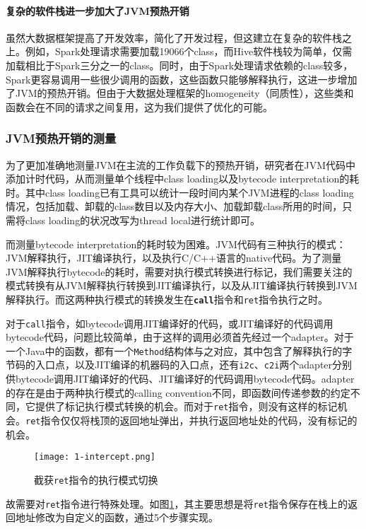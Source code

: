 \documentclass[lang=cn,12pt,a4paper,cite=authoryear]{elegantpaper}
\begin{document}
\begin{figure*}[!htp]
\paragraph{复杂的软件栈进一步加大了JVM预热开销} 虽然大数据框架提高了开发效率，简化了开发过程，但这建立在复杂的软件栈之上。例如，Spark处理请求需要加载19066个class，而Hive软件栈较为简单，仅需加载相比于Spark三分之一的class。同时，由于Spark处理请求依赖的class较多，Spark更容易调用一些很少调用的函数，这些函数只能够解释执行，这进一步增加了JVM的预热开销。但由于大数据处理框架的homogeneity（同质性），这些类和函数会在不同的请求之间复用，这为我们提供了优化的可能。

\subsubsection{JVM预热开销的测量}
为了更加准确地测量JVM在主流的工作负载下的预热开销，研究者在JVM代码中添加计时代码，从而测量单个线程中class loading以及bytecode interpretation的耗时。其中class loading已有工具可以统计一段时间内某个JVM进程的class loading情况，包括加载、卸载的class数目以及内存大小、加载卸载class所用的时间，只需将class loading的状况改写为thread local进行统计即可。

而测量bytecode interpretation的耗时较为困难。JVM代码有三种执行的模式：JVM解释执行，JIT编译执行，以及执行C/C++语言的native代码。为了测量JVM解释执行bytecode的耗时，需要对执行模式转换进行标记，我们需要关注的模式转换有从JVM解释执行转换到JIT编译执行，以及从JIT编译执行转换到JVM解释执行。而这两种执行模式的转换发生在\textbf{\texttt{call}}指令和\texttt{ret}指令执行之时。

对于\texttt{call}指令，如bytecode调用JIT编译好的代码，或JIT编译好的代码调用bytecode代码，问题比较简单，由于这样的调用必须首先经过一个adapter。对于一个Java中的函数，都有一个\texttt{Method}结构体与之对应，其中包含了解释执行的字节码的入口点，以及JIT编译的机器码的入口点，还有\texttt{i2c}、\texttt{c2i}两个adapter分别供bytecode调用JIT编译好的代码、JIT编译好的代码调用bytecode代码。adapter的存在是由于两种执行模式的calling convention不同，即函数间传递参数的约定不同，它提供了标记执行模式转换的机会。而对于\texttt{ret}指令，则没有这样的标记机会。\texttt{ret}指令仅仅将栈顶的返回地址弹出，并执行返回地址处的代码，没有标记的机会。

\begin{figure}[!htp]
  \centering
  \texttt{[image: 1-intercept.png]}
  \caption{截获\texttt{ret}指令的执行模式切换}
  \label{fig:intercept}
\end{figure}

故需要对\texttt{ret}指令进行特殊处理。如图\ref{fig:intercept}，其主要思想是将\texttt{ret}指令保存在栈上的返回地址修改为自定义的函数，通过5个步骤实现。


\end{figure*}
\end{document}
